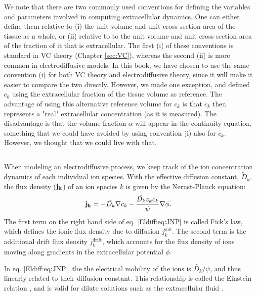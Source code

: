 We note that there are two commonly used conventions for defining the variables and parameters involved in computing extracellular dynamics. One can either define them relative to (i) the unit volume and unit cross section area of the tissue as a whole, or (ii) relative to to the unit volume and unit cross section area of the fraction of it that is extracellular. The first (i) of these conventions is standard in VC theory (Chapter \ref{sec:VC}), whereas the second (ii) is more common in electrodiffusive models. In this book, we have chosen to use the same convention (i) for both VC theory and electrodiffusive theory, since it will make it easier to compare the two directly. However, we made one exception, and defined $c_k$ using the extracellular fraction of the tissue volume as reference. The advantage of using this alternative reference volume for $c_k$ is that $c_k$ then represents a "real" extracellular concentration (as it is measured). The disadvantage is that the volume fraction $\alpha$ will appear in the continuity equation, something that we could have avoided by using convention (i) also for $c_k$. However, we thought that we could live with that.


\subsection{}
\label{sec:Eldiff:ionconcentrationdynamics}
When modeling an electrodiffusive process, we keep track of the ion concentration dynamics of each individual ion species. With the effective diffusion constant, $\tilde{D}_k$, the flux density (${\bf j_k}$) of an ion species $k$ is given by the Nernst-Planck equation:
\begin{equation}
{\bf j_k} = - \tilde{D_k} {\bf \nabla} c_{k} - \frac{\tilde{D_k} z_k c_k}{\psi} {\bf \nabla} \phi.
\label{Eldiff:eq:JNP}
\end{equation}
The first term on the right hand side of eq. \ref{Eldiff:eq:JNP} is called Fick's law, which defines the ionic flux density due to diffusion $j_{k}^\text{diff}$. The second term is the additional drift flux density $j_{k}^\text{drift}$, which accounts for the flux density of ions moving along gradients in the extracellular potential $\phi$.

In eq. \ref{Eldiff:eq:JNP}, the the electrical mobility of the ions is $\tilde{D_k}/\psi$, and thus linearly related to their diffusion constant. This relationship is called the Einstein relation , and is valid for dilute solutions such as the extracellular fluid \citep{Grodzinsky2011}.

